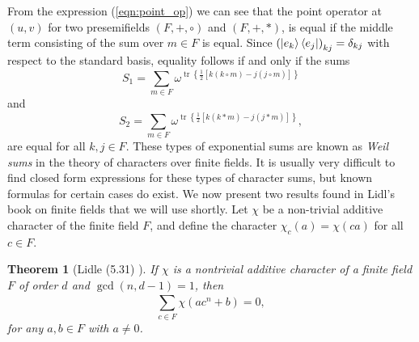 \documentclass[a4paper, 11pt]{article}
\DeclareMathOperator{\tr}{tr}
\newtheorem{theorem}{Theorem}
\begin{document}
  From the expression (\ref{eqn:point_op}) we can see that
  the point operator at $(u,v)$ for two presemifields
  $(F,+,\circ)$ and $(F,+,*)$, is equal if the middle term
  consisting of the sum over $m \in F$ is equal. Since
  $\left(\ket{e_k}\bra{e_j}\right)_{kj} = \delta_{kj}$ with
  respect to the standard basis, equality follows if and
  only if the sums
  \begin{equation}
    \label{eqn:weil_left}
    S_1 
    = \sum_{m \in F}^{} 
    \omega^{\tr\left\{ 
        \frac{1}{2}\left[ k(k\circ m) - j(j\circ m) \right]
    \right\} }
  \end{equation}
  and
  \begin{equation}
    \label{eqn:weil_right}
    S_2
    = \sum_{m \in F}^{} 
    \omega^{\tr\left\{ 
        \frac{1}{2} \left[ k(k * m) - j(j * m)\right]
    \right\} },
  \end{equation}
  are equal for all $k,j \in F$. These types of exponential
  sums are known as \textit{Weil sums} in the theory of
  characters over finite fields. It is usually very
  difficult to find closed form expressions for these types
  of character sums, but known formulas for certain cases do
  exist. We now present two results found in Lidl's book on
  finite fields \cite{lidl1997} that we will use shortly.
  Let $\chi$ be a non-trivial additive character of the
  finite field $F$, and define the character $\chi_c(a) =
  \chi(ca)$ for all $c \in F$.

  \begin{theorem}[Lidle (5.31) \cite{lidl1997}]
    \label{thm:lidl_1}
    If $\chi$ is a nontrivial additive character of a finite
    field $F$ of order $d$ and $\gcd(n,d-1) = 1$, then
    \begin{equation}
      \sum_{c \in F}^{} \chi\left( ac^{n}+b \right) 
      = 0,
    \end{equation}
    for any $a,b \in F$ with $a \neq 0$.
  \end{theorem}
\end{document}
